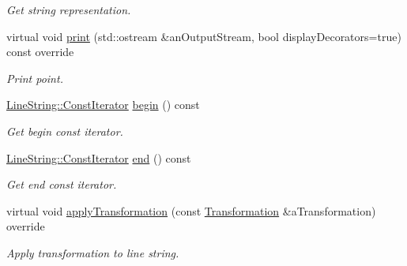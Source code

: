 \begin{DoxyCompactItemize}
\begin{DoxyCompactList}\small\item\em Get string representation. \end{DoxyCompactList}\item 
virtual void \hyperlink{classostk_1_1math_1_1geom_1_1d2_1_1objects_1_1_line_string_afcdaa3f11f0bd830af0311392c7e9e26}{print} (std\+::ostream \&an\+Output\+Stream, bool display\+Decorators=true) const override
\begin{DoxyCompactList}\small\item\em Print point. \end{DoxyCompactList}\item 
\hyperlink{classostk_1_1math_1_1geom_1_1d2_1_1objects_1_1_line_string_a29e6326c716bef2ec438534cfdc1e118}{Line\+String\+::\+Const\+Iterator} \hyperlink{classostk_1_1math_1_1geom_1_1d2_1_1objects_1_1_line_string_a67bd071017fdd15e96b8930d4e16aacd}{begin} () const
\begin{DoxyCompactList}\small\item\em Get begin const iterator. \end{DoxyCompactList}\item 
\hyperlink{classostk_1_1math_1_1geom_1_1d2_1_1objects_1_1_line_string_a29e6326c716bef2ec438534cfdc1e118}{Line\+String\+::\+Const\+Iterator} \hyperlink{classostk_1_1math_1_1geom_1_1d2_1_1objects_1_1_line_string_ac8336b4c3418337eb1b04f6eb7e11927}{end} () const
\begin{DoxyCompactList}\small\item\em Get end const iterator. \end{DoxyCompactList}\item 
virtual void \hyperlink{classostk_1_1math_1_1geom_1_1d2_1_1objects_1_1_line_string_afd26337c26696a0ff1b4b2e94e58f17c}{apply\+Transformation} (const \hyperlink{classostk_1_1math_1_1geom_1_1d2_1_1_transformation}{Transformation} \&a\+Transformation) override
\begin{DoxyCompactList}\small\item\em Apply transformation to line string. \end{DoxyCompactList}\end{DoxyCompactItemize}
